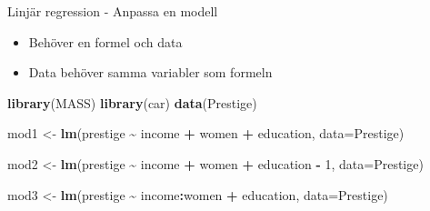 \documentclass[
  11pt,
  ignorenonframetext,
  handout]{beamer}
\newenvironment{Shaded}{\begin{snugshade}}{\end{snugshade}}
\newcommand{\AttributeTok}[1]{\textcolor[rgb]{0.13,0.29,0.53}{#1}}
\newcommand{\DecValTok}[1]{\textcolor[rgb]{0.00,0.00,0.81}{#1}}
\newcommand{\FunctionTok}[1]{\textcolor[rgb]{0.13,0.29,0.53}{\textbf{#1}}}
\newcommand{\NormalTok}[1]{#1}
\newcommand{\OtherTok}[1]{\textcolor[rgb]{0.56,0.35,0.01}{#1}}
\newcommand{\SpecialCharTok}[1]{\textcolor[rgb]{0.81,0.36,0.00}{\textbf{#1}}}
\providecommand{\tightlist}{%
  \setlength{\itemsep}{0pt}\setlength{\parskip}{0pt}}
\begin{document}
\begin{frame}[fragile]{Linjär regression - Anpassa en modell}
\protect{}\label{linjuxe4r-regression---anpassa-en-modell}
\begin{itemize}
\tightlist
\item
  Behöver en formel och data
\item
  Data behöver samma variabler som formeln
\end{itemize}

\begin{Shaded}
\begin{Highlighting}[]
\FunctionTok{library}\NormalTok{(MASS)}
\FunctionTok{library}\NormalTok{(car)}
\FunctionTok{data}\NormalTok{(Prestige)}
\end{Highlighting}
\end{Shaded}

\begin{Shaded}
\begin{Highlighting}[]
\NormalTok{mod1 }\OtherTok{\textless{}{-}} \FunctionTok{lm}\NormalTok{(prestige }\SpecialCharTok{\textasciitilde{}}\NormalTok{ income }\SpecialCharTok{+}\NormalTok{ women }\SpecialCharTok{+}\NormalTok{ education, }\AttributeTok{data=}\NormalTok{Prestige)}
\end{Highlighting}
\end{Shaded}

\begin{Shaded}
\begin{Highlighting}[]
\NormalTok{mod2 }\OtherTok{\textless{}{-}} \FunctionTok{lm}\NormalTok{(prestige }\SpecialCharTok{\textasciitilde{}}\NormalTok{ income }\SpecialCharTok{+}\NormalTok{ women }\SpecialCharTok{+}\NormalTok{ education }\SpecialCharTok{{-}} \DecValTok{1}\NormalTok{, }\AttributeTok{data=}\NormalTok{Prestige)}
\end{Highlighting}
\end{Shaded}

\begin{Shaded}
\begin{Highlighting}[]
\NormalTok{mod3 }\OtherTok{\textless{}{-}} \FunctionTok{lm}\NormalTok{(prestige }\SpecialCharTok{\textasciitilde{}}\NormalTok{ income}\SpecialCharTok{:}\NormalTok{women }\SpecialCharTok{+}\NormalTok{ education, }\AttributeTok{data=}\NormalTok{Prestige)}
\end{Highlighting}
\end{Shaded}
\end{frame}
\end{document}
